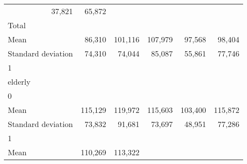 \begin{tabular}{llllll}
  \multicolumn{1}{r}{37,821} &
  \multicolumn{1}{r}{65,872} \\
\multicolumn{1}{l}{\hspace{3em}Total} &
  \multicolumn{1}{|r}{} &
  \multicolumn{1}{r}{} &
  \multicolumn{1}{r}{} &
  \multicolumn{1}{r}{} &
  \multicolumn{1}{r}{} \\
\multicolumn{1}{l}{\hspace{4em}Mean} &
  \multicolumn{1}{|r}{86,310} &
  \multicolumn{1}{r}{101,116} &
  \multicolumn{1}{r}{107,979} &
  \multicolumn{1}{r}{97,568} &
  \multicolumn{1}{r}{98,404} \\
\multicolumn{1}{l}{\hspace{4em}Standard deviation} &
  \multicolumn{1}{|r}{74,310} &
  \multicolumn{1}{r}{74,044} &
  \multicolumn{1}{r}{85,087} &
  \multicolumn{1}{r}{55,861} &
  \multicolumn{1}{r}{77,746} \\
\multicolumn{1}{l}{\hspace{1em}1} &
  \multicolumn{1}{|r}{} &
  \multicolumn{1}{r}{} &
  \multicolumn{1}{r}{} &
  \multicolumn{1}{r}{} &
  \multicolumn{1}{r}{} \\
\multicolumn{1}{l}{\hspace{2em}elderly} &
  \multicolumn{1}{|r}{} &
  \multicolumn{1}{r}{} &
  \multicolumn{1}{r}{} &
  \multicolumn{1}{r}{} &
  \multicolumn{1}{r}{} \\
\multicolumn{1}{l}{\hspace{3em}0} &
  \multicolumn{1}{|r}{} &
  \multicolumn{1}{r}{} &
  \multicolumn{1}{r}{} &
  \multicolumn{1}{r}{} &
  \multicolumn{1}{r}{} \\
\multicolumn{1}{l}{\hspace{4em}Mean} &
  \multicolumn{1}{|r}{115,129} &
  \multicolumn{1}{r}{119,972} &
  \multicolumn{1}{r}{115,603} &
  \multicolumn{1}{r}{103,400} &
  \multicolumn{1}{r}{115,872} \\
\multicolumn{1}{l}{\hspace{4em}Standard deviation} &
  \multicolumn{1}{|r}{73,832} &
  \multicolumn{1}{r}{91,681} &
  \multicolumn{1}{r}{73,697} &
  \multicolumn{1}{r}{48,951} &
  \multicolumn{1}{r}{77,286} \\
\multicolumn{1}{l}{\hspace{3em}1} &
  \multicolumn{1}{|r}{} &
  \multicolumn{1}{r}{} &
  \multicolumn{1}{r}{} &
  \multicolumn{1}{r}{} &
  \multicolumn{1}{r}{} \\
\multicolumn{1}{l}{\hspace{4em}Mean} &
  \multicolumn{1}{|r}{110,269} &
  \multicolumn{1}{r}{113,322} &

\end{tabular}
